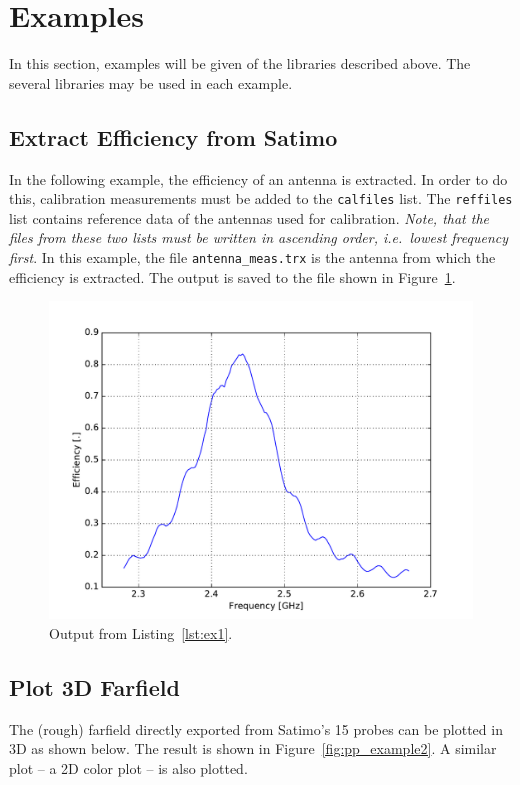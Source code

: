 \section{Examples}

In this section, examples will be given of the libraries described above. The several libraries may be used in each example.

\subsection{Extract Efficiency from Satimo}
In the following example, the efficiency of an antenna is extracted. In order to do this, calibration measurements must be added to the \texttt{calfiles} list. The \texttt{reffiles} list contains reference data of the antennas used for calibration. \emph{Note, that the files from these two lists must be written in ascending order, i.e.\ lowest frequency first}. In this example, the file \texttt{antenna\_meas.trx} is the antenna from which the efficiency is extracted. The output is saved to the file shown in Figure~\ref{fig:pp_example1}.



\begin{figure}[htbp]
    \centering
    \includegraphics[scale=0.5]{sec/post_processing/examples/ex1_efficiency.pdf}
    \caption{Output from Listing~\ref{lst:ex1}.}
    \label{fig:pp_example1}
\end{figure}


\subsection{Plot 3D Farfield}
The (rough) farfield directly exported from Satimo's 15 probes can be plotted in 3D as shown below. The result is shown in Figure~\ref{fig:pp_example2}. A similar plot -- a 2D color plot -- is also plotted.

